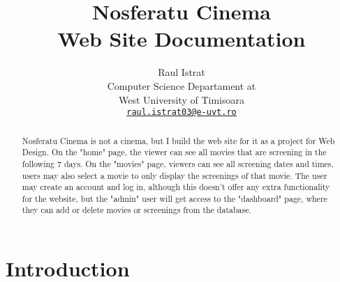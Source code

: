 \documentclass[a4paper]{article}
\title{Nosferatu Cinema\\Web Site Documentation}
\author{Raul Istrat\\
Computer Science Departament at\\
West University of Timisoara\\
\href{mailto:raul.istrat03@e-uvt.ro}{\texttt{raul.istrat03@e-uvt.ro}}}
\date{}
\begin{document}
\maketitle

\begin{abstract}
    Nosferatu Cinema is not a cinema, but I build the web site for it as a project for Web Design. On the "home" page, the viewer can see all movies that are screening in the following 7 days. On the "movies" page, viewers can see all screening dates and times, users may also select a movie to only display the screenings of that movie. The user may create an account and log in, although this doesn't offer any extra functionality for the website, but the "admin" user will get access to the "dashboard" page, where they can add or delete movies or screenings from the database.
\end{abstract}

\section{Introduction}
\end{document}
